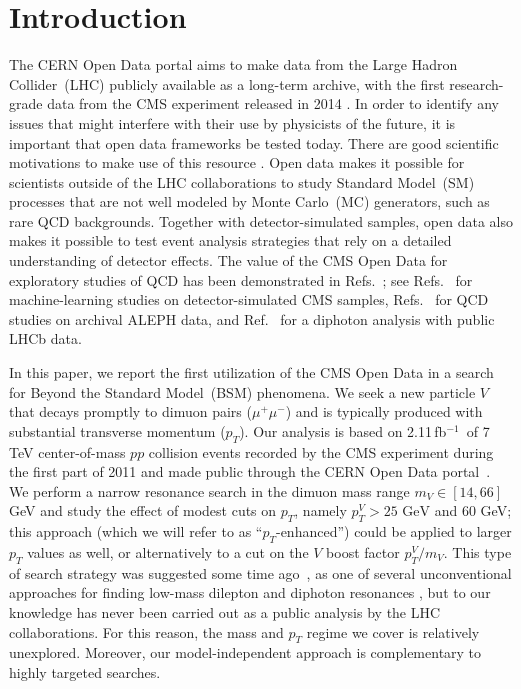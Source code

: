 \documentclass[aps,prd,twocolumn,superscriptaddress,preprintnumbers,nofootinbib,longbibliography,floatfix]{revtex4-1}
\newcommand{\GeV}{\text{~GeV}}
\newcommand{\inv}{$^{-1}$}
\DeclareRobustCommand{\Ref}[1]{Ref.~\cite{#1}}
\DeclareRobustCommand{\Refs}[1]{Refs.~\cite{#1}}
\begin{document}
\maketitle

\tableofcontents



\section{Introduction}
\label{sec:intro}

The CERN Open Data portal \cite{CERNOpenData} aims to make data from the Large Hadron Collider~(LHC) publicly available as a long-term archive, with the first research-grade data from the CMS experiment released in 2014 \cite{CMSOpenData}.
%
In order to identify any issues that might interfere with their use by physicists of the future, it is important that open data frameworks be tested today.
%
There are good scientific motivations to make use of this resource \cite{CMS:OpenAccess}.
%
Open data makes it possible for scientists outside of the LHC collaborations to study Standard Model~(SM) processes that are not well modeled by Monte Carlo~(MC) generators, such as rare QCD backgrounds.
%
Together with detector-simulated samples, open data also makes it possible to test event analysis strategies that rely on a detailed understanding of detector effects.
%
The value of the CMS Open Data for exploratory studies of QCD has been demonstrated in \Refs{Tripathee:2017ybi,Larkoski:2017bvj}; see \Refs{Madrazo:2017qgh,Andrews:2018nwy,Andrews:2019faz} for machine-learning studies on detector-simulated CMS samples, \Refs{Kile:2017ryy,Kile:2017ccn,Kile:2017psu} for QCD studies on archival ALEPH data, and \Ref{CidVidal:2018blh} for a diphoton analysis with public LHCb data.


In this paper, we report the first utilization of the CMS Open Data in a search for Beyond the Standard Model~(BSM) phenomena.
%
We seek a new particle $V$ that decays promptly to dimuon pairs ($\mu^+\mu^-$) and is typically 
produced with substantial transverse momentum ($p_T$).
%
Our analysis is based on 2.11\,fb\inv\ of 7 TeV center-of-mass $pp$ collision events recorded by the CMS experiment during the first part of 2011 and made public through the CERN Open Data portal~\cite{CMS:DiMuonPrimary}.
%
We perform a narrow resonance search in the dimuon mass range $m_V \in [14,66]$ GeV and study the effect of modest cuts on $p_T$, namely $p^V_T>25 \GeV$ and 60 GeV; this approach (which we will refer to as ``$p_T$-enhanced'') could be applied to larger $p_T$ values as well, or alternatively to a cut on the $V$ boost factor $p^V_T/m_V$.
%
This type of search strategy was suggested some time ago~\cite{Strassler:MITBerkeley}, as one of several unconventional approaches for finding low-mass dilepton and diphoton resonances \cite{Strassler:KITP08}, but to our knowledge has never been carried out as a public analysis by the LHC collaborations. 
%
For this reason, the mass and $p_T$ regime we cover is relatively unexplored.
%
Moreover, our model-independent approach is complementary to highly targeted searches.
\end{document}
